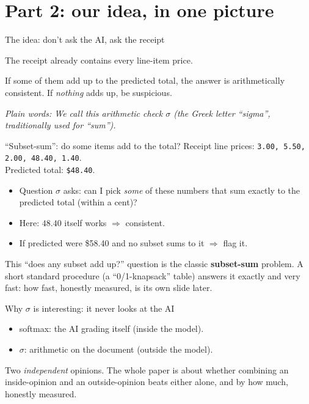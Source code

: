 \documentclass[aspectratio=169]{beamer}
\newcommand{\bigq}[1]{\begin{center}{\Large #1}\end{center}}
\newcommand{\keybox}[1]{\begin{center}\colorbox{grey!15}{\parbox{0.92\linewidth}{\centering #1}}\end{center}}
\newcommand{\plain}[1]{\textit{\textcolor{sig}{Plain words:} #1}}
\begin{document}
\section{Part 2: our idea, in one picture}
\begin{frame}{The idea: don't ask the AI, ask the receipt}
\bigq{The receipt already contains every line-item price.}
\vspace{0.6em}
\bigq{If some of them add up to the predicted total, the answer is
arithmetically consistent. If \emph{nothing} adds up, be suspicious.}
\vspace{0.6em}
\plain{We call this arithmetic check \textbf{$\sigma$} (the Greek
letter ``sigma'', traditionally used for ``sum'').}
\end{frame}

\begin{frame}{``Subset-sum'': do some items add to the total?}
Receipt line prices: \;\texttt{3.00, 5.50, 2.00, 48.40, 1.40}.\\
Predicted total: \;\texttt{\$48.40}.
\vspace{0.8em}
\begin{itemize}
\item Question $\sigma$ asks: can I pick \emph{some} of these numbers
that sum exactly to the predicted total (within a cent)?
\item Here: $48.40$ itself works $\Rightarrow$ \textcolor{ok}{consistent}.
\item If predicted were \$58.40 and no subset sums to it
$\Rightarrow$ \textcolor{bad}{flag it}.
\end{itemize}
\keybox{This ``does any subset add up?'' question is the classic
\textbf{subset-sum} problem. A short standard procedure (a
``0/1-knapsack'' table) answers it exactly and very fast: how fast,
honestly measured, is its own slide later.}
\end{frame}

\begin{frame}{Why $\sigma$ is interesting: it never looks at the AI}
\begin{itemize}
\item softmax: the AI grading itself (inside the model).
\item $\sigma$: arithmetic on the document (outside the model).
\end{itemize}
\vspace{1em}
\keybox{Two \emph{independent} opinions. The whole paper is about
whether combining an inside-opinion and an outside-opinion beats
either alone, and by how much, honestly measured.}
\end{frame}
\end{document}
